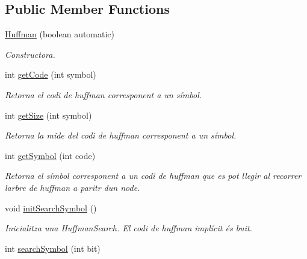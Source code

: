 \subsection*{Public Member Functions}
\begin{DoxyCompactItemize}
\item 
\hyperlink{classdomini_1_1algorithm_1_1Huffman_ad5963e423f25e932ed78779bc000edaf}{Huffman} (boolean automatic)
\begin{DoxyCompactList}\small\item\em Constructora. \end{DoxyCompactList}\item 
int \hyperlink{classdomini_1_1algorithm_1_1Huffman_aed38ea297e6463f016a74d0ba405768a}{get\+Code} (int symbol)
\begin{DoxyCompactList}\small\item\em Retorna el codi de huffman corresponent a un símbol. \end{DoxyCompactList}\item 
int \hyperlink{classdomini_1_1algorithm_1_1Huffman_a2791541d1b5a3d65912fad5979d41dfd}{get\+Size} (int symbol)
\begin{DoxyCompactList}\small\item\em Retorna la mide del codi de huffman corresponent a un símbol. \end{DoxyCompactList}\item 
int \hyperlink{classdomini_1_1algorithm_1_1Huffman_a426cb1d15e2fe89a55e5b0f25e887342}{get\+Symbol} (int code)
\begin{DoxyCompactList}\small\item\em Retorna el símbol corresponent a un codi de huffman que es pot llegir al recorrer l\textquotesingle{}arbre de huffman a paritr d\textquotesingle{}un node. \end{DoxyCompactList}\item 
\mbox{\label{classdomini_1_1algorithm_1_1Huffman_aec935898b93387360acd588a05dc3f33}} 
void \hyperlink{classdomini_1_1algorithm_1_1Huffman_aec935898b93387360acd588a05dc3f33}{init\+Search\+Symbol} ()
\begin{DoxyCompactList}\small\item\em Inicialitza una Huffman\+Search. El codi de huffman implícit és buit. \end{DoxyCompactList}\item 
int \hyperlink{classdomini_1_1algorithm_1_1Huffman_a56a954cb68aad6701b609d0fc2c7c724}{search\+Symbol} (int bit)

\end{DoxyCompactItemize}
